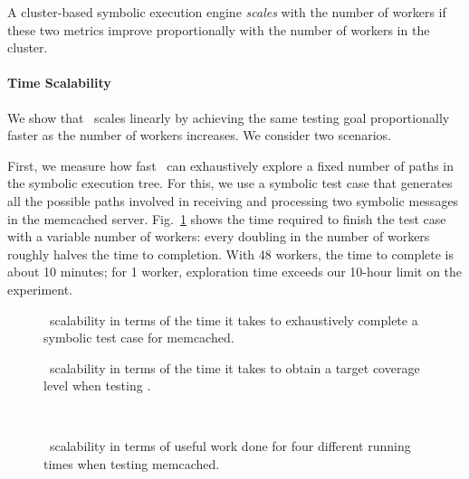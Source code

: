 A cluster-based symbolic execution engine \emph{scales} with the number of workers if these two metrics improve proportionally with the number of workers in the cluster.

\paragraph{Time Scalability} We show that \cnine\ scales linearly by achieving the same testing goal proportionally faster as the number of workers increases. We consider two scenarios.

First, we measure how fast \cnine\ can exhaustively explore a fixed number of paths in the symbolic execution tree.  For this, we use a symbolic test case that generates all the possible paths involved in receiving and processing two symbolic messages in the memcached server.  Fig.~\ref{fig:scalab-time-vs-workers} shows the time required to finish the test case with a variable number of workers: every doubling in the number of workers roughly halves the time to completion.  With 48 workers, the time to complete is about 10 minutes; for 1 worker,  exploration time exceeds our 10-hour limit on the experiment.  


\begin{figure}[h!]
  \centering
  \caption{\cnine\ scalability in terms of the time it takes to exhaustively complete a symbolic test case for memcached.}
  \label{fig:scalab-time-vs-workers}
\end{figure}

\begin{figure}[h!]
  \centering
  \caption{\cnine\ scalability in terms of the time it takes to obtain a target coverage level when testing .}
  \label{fig:scalab-time-vs-workers-cov}
\end{figure}

\begin{figure}[t!]
  \centering
   \\
  \caption{\cnine\ scalability in terms of useful work done for four different running times when testing memcached.}
  \label{fig:scalab-memcached}
\end{figure}

